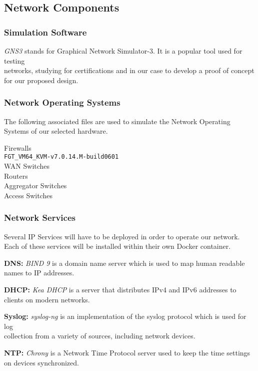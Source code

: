 \documentclass[12pt, letterpaper]{article}
\begin{document}
	\subsection{Network Components}
		\subsubsection{Simulation Software}
\textit{GNS3} stands for Graphical Network Simulator-3. It is a popular tool used for testing \\ networks, studying for certifications and in our  case to develop a proof of concept for our proposed design.
 
		\subsubsection{Network Operating Systems}
The following associated files are used to simulate the Network Operating Systems of
our selected hardware.


Firewalls \\
\texttt{FGT\_VM64\_KVM-v7.0.14.M-build0601} \\
WAN Switches \\
Routers \\
Aggregator Switches \\
Access Switches

		

		\subsubsection{Network Services}
Several IP Services will have to be deployed in order to operate our network. Each of these services will be installed within their own Docker container.

\textbf{DNS:} \textit{BIND 9} is a domain name server which is used to map human readable names to IP addresses.

\smallskip

\textbf{DHCP:} \textit{Kea DHCP} is a server that distributes IPv4 and IPv6 addresses to clients on modern networks. 

\smallskip

\textbf{Syslog:} \textit{syslog-ng} is an implementation of the syslog protocol which is used for log \\ collection from a variety of sources, including network devices.

\smallskip

\textbf{NTP:} \textit{Chrony} is a Network Time Protocol server used to keep the time settings on devices synchronized.
\end{document}
